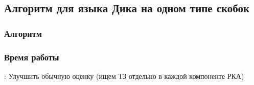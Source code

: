 \subsection{Алгоритм для языка Дика на одном типе скобок}

\subsubsection{Алгоритм}

\subsubsection{Время работы}

\TODO: Улучшить обычную оценку (ищем ТЗ отдельно в каждой компоненте РКА)